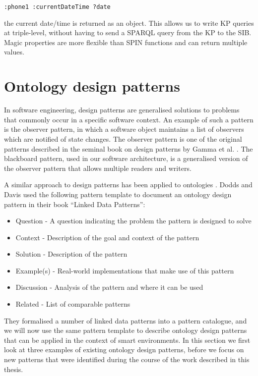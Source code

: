 \begin{verbatim}
:phone1 :currentDateTime ?date
\end{verbatim}

the current date/time is returned as an object. This allows us to write \ac{KP} queries at triple-level, without having to send a \ac{SPARQL} query from the \ac{KP} to the \ac{SIB}. Magic properties are more flexible than \ac{SPIN} functions and can return multiple values.




\section{Ontology design patterns}\label{DesignPatterns}

In software engineering, design patterns are generalised solutions to problems that commonly occur in a specific software context. An example of such a pattern is the observer pattern, in which a software object maintains a list of observers which are notified of state changes. The observer pattern is one of the original patterns described in the seminal book on design patterns by Gamma et al. \cite{Gamma1994}.  The blackboard pattern, used in our software architecture, is a generalised version of the observer pattern that allows multiple readers and writers. 

A similar approach to design patterns has been applied to ontologies \cite{Gangemi2008, Hoekstra2009, Dodds2011}. Dodds and Davis \cite{Dodds2011} used the following pattern template to document an ontology design pattern in their book ``Linked Data Patterns'':

\begin{itemize}
	\item Question - A question indicating the problem the pattern is designed to solve
	\item Context - Description of the goal and context of the pattern
	\item Solution - Description of the pattern
	\item Example(s) - Real-world implementations that make use of this pattern
	\item Discussion - Analysis of the pattern and where it can be used
	\item Related - List of comparable patterns
\end{itemize}

They formalised a number of linked data patterns into a pattern catalogue, and we will now use the same pattern template to describe ontology design patterns that can be applied in the context of smart environments. In this section we first look at three examples of existing ontology design patterns, before we focus on new patterns that were identified during the course of the work described in this thesis.

